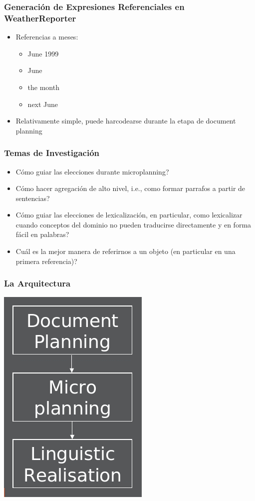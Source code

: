 \documentclass[compress,color=usenames]{beamer}
\begin{document}
\begin{frame}
\frametitle{Generaci\'on de Expresiones Referenciales en WeatherReporter}

\begin{itemize}
\item {{Referencias a meses:}}
\begin{itemize}
\item June 1999
\item June
\item the month
\item next June
\end{itemize}
\item Relativamente simple, puede harcodearse durante la etapa de document planning
\end{itemize}
\end{frame}

\begin{frame}
\frametitle{Temas de Investigaci\'on}

\begin{itemize}
\item C\'omo guiar las elecciones durante microplanning?
\item C\'omo hacer agregaci\'on de alto nivel, i.e., como formar parrafos a partir de sentencias?
\item C\'omo guiar las elecciones de lexicalizaci\'on, en particular, como lexicalizar cuando 
conceptos del dominio no pueden traducirse directamente y en forma f\'acil en palabras? 
\item Cu\'al es la mejor manera de referirnos a un objeto (en particular en una primera referencia)?
\end{itemize}
\end{frame}

\begin{frame}
\frametitle{La Arquitectura}

\begin{center}
\includegraphics[scale=.4]{pics/pic11.jpg}
\end{center}
 
\end{frame}
\end{document}
